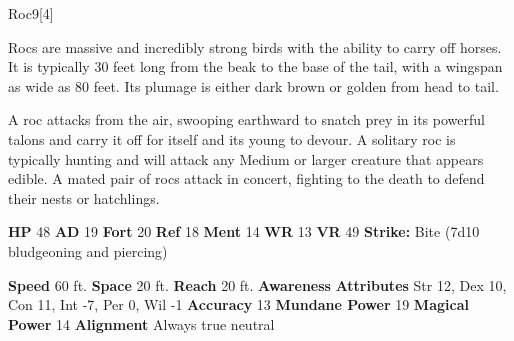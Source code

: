  
  \begin{monsection}{Roc}{9}[4]
    \vspace{-1em}\vspace{-1em}
    \vspace{0em}

    
      Rocs are massive and incredibly strong birds with the ability to carry off horses.
      It is typically 30 feet long from the beak to the base of the tail, with a wingspan as wide as 80 feet.
      Its plumage is either dark brown or golden from head to tail.

      A roc attacks from the air, swooping earthward to snatch prey in its powerful talons and carry it off for itself and its young to devour.
      A solitary roc is typically hunting and will attack any Medium or larger creature that appears edible.
      A mated pair of rocs attack in concert, fighting to the death to defend their nests or hatchlings.
    
    

    \begin{spellcontent}
      \begin{spelltargetinginfo}
        \pari \textbf{HP} 48 \monsep
          \textbf{AD} 19 \monsep
          \textbf{Fort} 20 \monsep
          \textbf{Ref} 18 \monsep
          \textbf{Ment} 14
        \pari \textbf{WR} 13 \monsep
        \textbf{VR} 49
        \pari \textbf{Strike:}
            Bite  (7d10 bludgeoning and piercing)
      \end{spelltargetinginfo}
    \end{spellcontent}
    \begin{monsterfooter}
      \pari \textbf{Speed} 60 ft. \monsep
        \textbf{Space} 20 ft. \monsep
        \textbf{Reach} 20 ft.
      \pari \textbf{Awareness} 
      \pari \textbf{Attributes}
        Str 12, Dex 10,
        Con 11, Int -7,
        Per 0, Wil -1
      \pari \textbf{Accuracy} 13 \monsep
        \textbf{Mundane Power} 19 \monsep
      \textbf{Magical Power} 14
      \pari \textbf{Alignment} Always true neutral
    \end{monsterfooter}
  \end{monsection}
  
